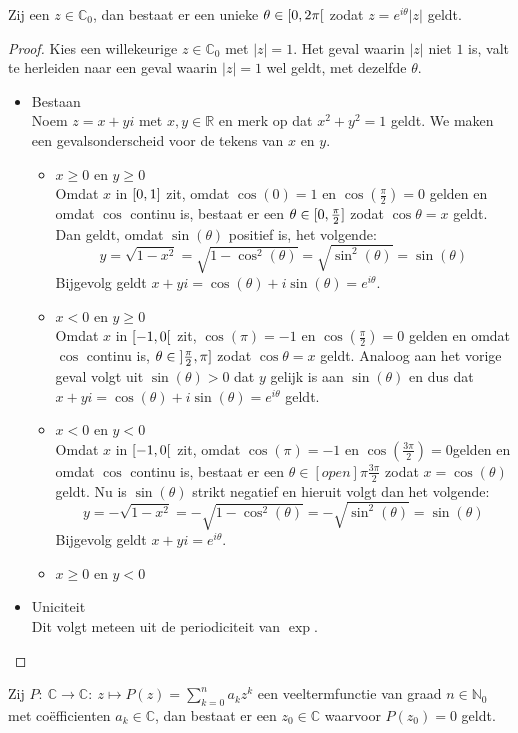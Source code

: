 \documentclass[main.tex]{subfiles}
\begin{document}
\begin{bpr}
  Zij een $z\in \mathbb{C}_{0}$, dan bestaat er een unieke $\theta \in \interval[open right]{0}{2\pi}$ zodat $z=e^{i\theta}|z|$ geldt.

  \begin{proof}
    Kies een willekeurige $z\in \mathbb{C}_{0}$ met $|z| = 1$.
    Het geval waarin $|z|$ niet $1$ is, valt te herleiden naar een geval waarin $|z|=1$ wel geldt, met dezelfde $\theta$. \waarom
    \begin{itemize}
    \item Bestaan\\
      Noem $z=x+yi$ met $x,y\in \mathbb{R}$ en merk op dat $x^{2}+y^{2}=1$ geldt.
      We maken een gevalsonderscheid voor de tekens van $x$ en $y$.
      \begin{itemize}
      \item $x\ge 0$ en $y\ge 0$\\
        Omdat $x$ in $\interval{0}{1}$ zit, omdat $\cos(0) = 1$ en $\cos\left(\frac{\pi}{2}\right) = 0$ gelden en omdat $\cos$ continu is, bestaat er een $\theta \in \interval{0}{\frac{\pi}{2}}$ zodat $\cos\theta = x$ geldt.
        Dan geldt, omdat $\sin(\theta)$ positief is\waarom, het volgende:
        \[ y = \sqrt{1-x^{2}} = \sqrt{1-\cos^{2}(\theta)} = \sqrt{\sin^{2}(\theta)} = \sin(\theta) \]
        Bijgevolg geldt $x+yi = \cos(\theta) + i \sin(\theta) = e^{i\theta}$.\needed
      \item $x<0$ en $y \ge 0$\\
        Omdat $x$ in $\interval[open right]{-1}{0}$ zit, $\cos(\pi) = -1$ en $\cos\left(\frac{\pi}{2}\right) = 0$ gelden en omdat $\cos$ continu is,  $\theta \in \interval[open left]{\frac{\pi}{2}}{\pi}$ zodat $\cos\theta = x$ geldt.
        Analoog aan het vorige geval volgt uit $\sin(\theta)>0$ dat $y$ gelijk is aan $\sin(\theta)$ en dus dat $x+yi = \cos(\theta) + i \sin(\theta) = e^{i\theta}$ geldt.
      \item $x<0$ en $y < 0$\\
        Omdat $x$ in $\interval[open right]{-1}{0}$ zit, omdat $\cos(\pi) = -1$ en $\cos\left(\frac{3\pi}{2}\right) = 0$\waarom gelden en omdat $\cos$ continu is, bestaat er een $\theta \in [open]{\pi}{\frac{3\pi}{2}}$ zodat $x = \cos(\theta)$ geldt.
        Nu is $\sin(\theta)$ strikt negatief en hieruit volgt dan het volgende:
        \[ y = -\sqrt{1-x^{2}} = -\sqrt{1-\cos^{2}(\theta)} = -\sqrt{\sin^{2}(\theta)} = \sin(\theta) \]
        Bijgevolg geldt $x+yi= e^{i\theta}$.
      \item $x\ge 0$ en $y< 0$\\
      \end{itemize}
    \item Uniciteit\\
      Dit volgt meteen uit de periodiciteit van $\exp$.
    \end{itemize}
  \end{proof}
\end{bpr}

\begin{bst}
  Zij $P:\ \mathbb{C} \rightarrow \mathbb{C}:\ z \mapsto P(z) = \sum_{k=0}^{n}a_{k}z^{k}$ een veeltermfunctie van graad $n\in \mathbb{N}_{0}$ met co\"efficienten $a_{k}\in \mathbb{C}$, dan bestaat er een $z_{0}\in \mathbb{C}$ waarvoor $P(z_{0})=0$ geldt.
\end{bst}
\end{document}
